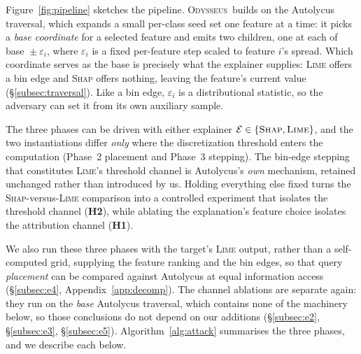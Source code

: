 \documentclass[sigconf,anonymous,review]{acmart}
\newcommand{\sys}{\textsc{Odysseus}}
\begin{document}
Figure~\ref{fig:pipeline} sketches the pipeline. \sys\ builds on the Autolycus traversal, which
expands a small per-class seed set one feature at a time: it picks a \emph{base coordinate} for a
selected feature and emits two children, one at each of base ${}\pm{}\varepsilon_i$, where
$\varepsilon_i$ is a fixed per-feature step scaled to feature $i$'s spread. Which coordinate serves
as the base is precisely what the explainer supplies: \textsc{Lime} offers a bin edge and
\textsc{Shap} offers nothing, leaving the feature's current value
(\S\ref{subsec:traversal}). Like a bin edge, $\varepsilon_i$ is a distributional statistic, so the
adversary can set it from its own auxiliary sample.

The three phases can be driven with either explainer $\mathcal{E} \in \{\textsc{Shap},
\textsc{Lime}\}$, and the two instantiations differ \emph{only} where the discretization threshold
enters the computation (Phase~2 placement and Phase~3 stepping). The bin-edge stepping that
constitutes \textsc{Lime}'s threshold channel is Autolycus's \emph{own} mechanism, retained unchanged
rather than introduced by us. Holding everything else fixed turns the
\textsc{Shap}-versus-\textsc{Lime} comparison into a controlled experiment that isolates the threshold
channel (\textbf{H2}), while ablating the explanation's feature choice isolates the attribution
channel (\textbf{H1}).

We also run these three phases with the target's \textsc{Lime} output, rather than a
self-computed grid,
supplying the feature ranking and the bin edges, so that query \emph{placement} can be compared
against Autolycus at equal information access (\S\ref{subsec:e4}, Appendix~\ref{app:decomp}). The
channel ablations are separate again: they run on the \emph{base} Autolycus traversal, which contains
none of the machinery below, so those conclusions do not depend on our additions
(\S\ref{subsec:e2}, \S\ref{subsec:e3}, \S\ref{subsec:e5}). Algorithm~\ref{alg:attack} summarises the
three phases, and we describe each below.
\end{document}
